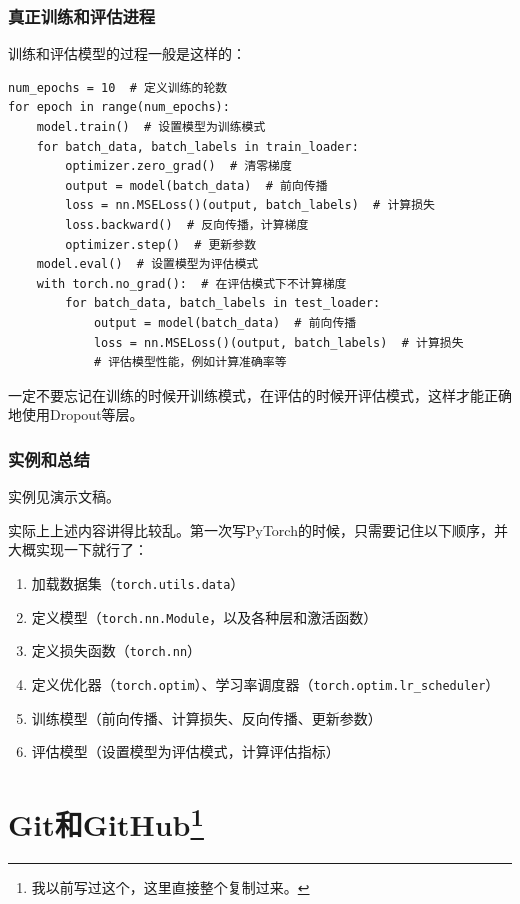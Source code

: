 \documentclass[fontset=none]{ctexart}
\begin{document}
\subsubsection{真正训练和评估进程}
训练和评估模型的过程一般是这样的：
\begin{verbatim}
num_epochs = 10  # 定义训练的轮数
for epoch in range(num_epochs):
    model.train()  # 设置模型为训练模式
    for batch_data, batch_labels in train_loader:
        optimizer.zero_grad()  # 清零梯度
        output = model(batch_data)  # 前向传播
        loss = nn.MSELoss()(output, batch_labels)  # 计算损失
        loss.backward()  # 反向传播，计算梯度
        optimizer.step()  # 更新参数
    model.eval()  # 设置模型为评估模式
    with torch.no_grad():  # 在评估模式下不计算梯度
        for batch_data, batch_labels in test_loader:
            output = model(batch_data)  # 前向传播
            loss = nn.MSELoss()(output, batch_labels)  # 计算损失
            # 评估模型性能，例如计算准确率等
\end{verbatim}
一定不要忘记在训练的时候开训练模式，在评估的时候开评估模式，这样才能正确地使用Dropout等层。

\subsubsection{实例和总结}

实例见演示文稿。

实际上上述内容讲得比较乱。第一次写PyTorch的时候，只需要记住以下顺序，并大概实现一下就行了：

\begin{enumerate}
        \item 加载数据集（\texttt{torch.utils.data}）
        \item 定义模型（\texttt{torch.nn.Module}，以及各种层和激活函数）
        \item 定义损失函数（\texttt{torch.nn}）
        \item 定义优化器（\texttt{torch.optim}）、学习率调度器（\texttt{torch.optim.lr_scheduler}）
    \item 训练模型（前向传播、计算损失、反向传播、更新参数）
    \item 评估模型（设置模型为评估模式，计算评估指标）
\end{enumerate}

\section[Git和GitHub]{Git和GitHub\protect\footnote{我以前写过这个，这里直接整个复制过来。}}
\end{document}
